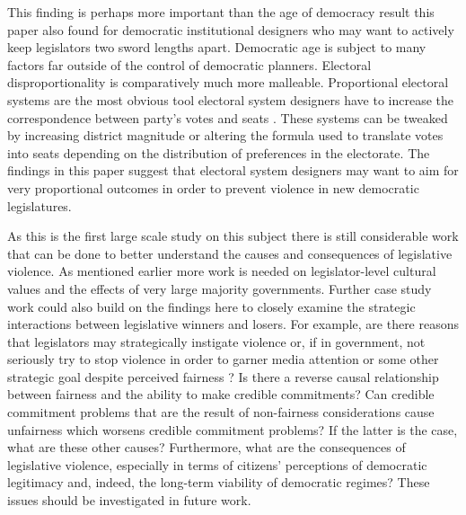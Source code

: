 \documentclass[a4paper]{article}\usepackage[]{graphicx}\usepackage[]{color}
\begin{document}
This finding is perhaps more important than the age of democracy result this paper also found for democratic institutional designers who may want to actively keep legislators two sword lengths apart. Democratic age is subject to many factors far outside of the control of democratic planners. Electoral disproportionality is comparatively much more malleable. Proportional electoral systems are the most obvious tool electoral system designers have to increase the correspondence between party's votes and seats \citep{Carey2011}. These systems can be tweaked by increasing district magnitude or altering the formula used to translate votes into seats depending on the distribution of preferences in the electorate. The findings in this paper suggest that electoral system designers may want to aim for very proportional outcomes in order to prevent violence in new democratic legislatures. 

As this is the first large scale study on this subject there is still considerable work that can be done to better understand the causes and consequences of legislative violence. As mentioned earlier more work is needed on legislator-level cultural values and the effects of very large majority governments. Further case study work could also build on the findings here to closely examine the strategic interactions between legislative winners and losers. For example, are there reasons that legislators may strategically instigate violence or, if in government, not seriously try to stop violence in order to garner media attention or some other strategic goal despite perceived fairness \citep[e.g.][]{Beaulieu2008,BeaulieuForthcoming}? Is there a reverse causal relationship between fairness and the ability to make credible commitments? Can credible commitment problems that are the result of non-fairness considerations cause unfairness which worsens credible commitment problems? If the latter is the case, what are these other causes? Furthermore, what are the consequences of legislative violence, especially in terms of citizens' perceptions of democratic legitimacy and, indeed, the long-term viability of democratic regimes? These issues should be investigated in future work. 





\theendnotes

\end{document}
